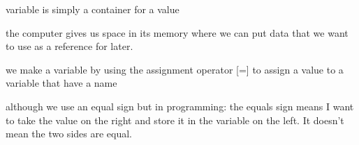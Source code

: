 variable is simply a container for a value

the computer gives us space in its memory where we can put data that we want to use as a reference for later.

we make a variable by using the assignment operator [=] to assign a value to a variable that have a name 

although we use an equal sign 
but in programming:
  the equals sign means I want to take the value on the right and store it in the variable on the left. It doesn't mean the two sides are equal.


